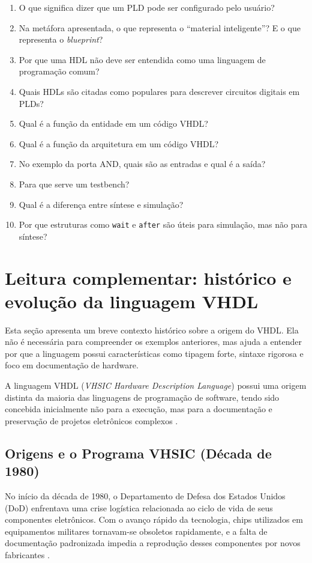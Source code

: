 \begin{enumerate}
    \item O que significa dizer que um PLD pode ser configurado pelo usuário?
    \item Na metáfora apresentada, o que representa o ``material inteligente''? E o que representa o \textit{blueprint}?
    \item Por que uma HDL não deve ser entendida como uma linguagem de programação comum?
    \item Quais HDLs são citadas como populares para descrever circuitos digitais em PLDs?
    \item Qual é a função da entidade em um código VHDL?
    \item Qual é a função da arquitetura em um código VHDL?
    \item No exemplo da porta AND, quais são as entradas e qual é a saída?
    \item Para que serve um testbench?
    \item Qual é a diferença entre síntese e simulação?
    \item Por que estruturas como \texttt{wait} e \texttt{after} são úteis para simulação, mas não para síntese?
\end{enumerate}

\section{Leitura complementar: histórico e evolução da linguagem VHDL}

Esta seção apresenta um breve contexto histórico sobre a origem do VHDL. Ela não é necessária para compreender os exemplos anteriores, mas ajuda a entender por que a linguagem possui características como tipagem forte, sintaxe rigorosa e foco em documentação de hardware.

A linguagem VHDL (\textit{VHSIC Hardware Description Language}) possui uma origem distinta da maioria das linguagens de programação de software, tendo sido concebida inicialmente não para a execução, mas para a documentação e preservação de projetos eletrônicos complexos \cite{ashenden2008designer}.

\subsection{Origens e o Programa VHSIC (Década de 1980)}
No início da década de 1980, o Departamento de Defesa dos Estados Unidos (DoD) enfrentava uma crise logística relacionada ao ciclo de vida de seus componentes eletrônicos. Com o avanço rápido da tecnologia, chips utilizados em equipamentos militares tornavam-se obsoletos rapidamente, e a falta de documentação padronizada impedia a reprodução desses componentes por novos fabricantes \cite{dod1981requirements,dewey1983vhdl}.

